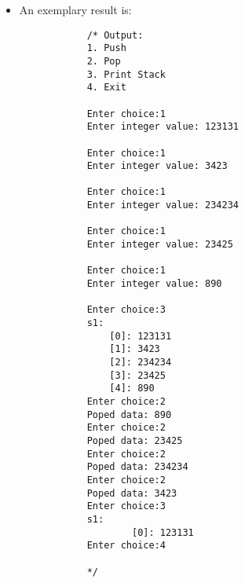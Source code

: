 \begin{itemize}
    \item An exemplary result is:
        \begin{verbatim}
            /* Output: 
            1. Push
            2. Pop
            3. Print Stack
            4. Exit

            Enter choice:1
            Enter integer value: 123131

            Enter choice:1
            Enter integer value: 3423

            Enter choice:1
            Enter integer value: 234234

            Enter choice:1
            Enter integer value: 23425

            Enter choice:1
            Enter integer value: 890

            Enter choice:3
            s1:
                [0]: 123131
                [1]: 3423
                [2]: 234234
                [3]: 23425
                [4]: 890
            Enter choice:2
            Poped data: 890
            Enter choice:2
            Poped data: 23425
            Enter choice:2
            Poped data: 234234
            Enter choice:2
            Poped data: 3423
            Enter choice:3
            s1:
                    [0]: 123131
            Enter choice:4

            */
        \end{verbatim}
\end{itemize}


